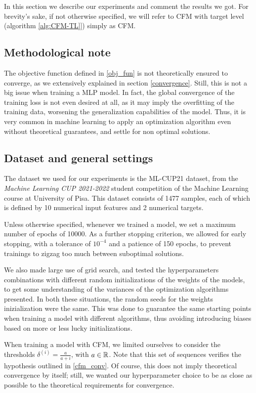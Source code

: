 In this section we describe our experiments and comment the results we got. For brevity's sake, if not otherwise specified, we will refer to CFM with target level (algorithm \ref{alg:CFM-TL}]) simply as CFM. 

\subsection{Methodological note}
The objective function defined in \ref{obj_fun} is not theoretically ensured to converge, as we extensively explained in section \ref{convergence}. Still, this is not a big issue when training a MLP model. In fact, the global convergence of the training loss is not even desired at all, as it may imply the overfitting of the training data, worsening the generalization capabilities of the model. Thus, it is very common in machine learning to apply an optimization algorithm even without theoretical guarantees, and settle for non optimal solutions.

\subsection{Dataset and general settings}
The dataset we used for our experiments is the ML-CUP21 dataset, from the \textit{Machine Learning CUP 2021-2022} student competition of the Machine Learning course at University of Pisa. This dataset consists of 1477 samples, each of which is defined by 10 numerical input features and 2 numerical targets.

Unless otherwise specified, whenever we trained a model, we set a maximum number of epochs of 10000. As a further stopping criterion, we allowed for early stopping, with a tolerance of $10^{-4}$ and a patience of 150 epochs, to prevent trainings to zigzag too much between suboptimal solutions.

We also made large use of grid search, and tested the hyperparameters combinations with different random initializations of the weights of the models, to get some understanding of the variances of the optimization algorithms presented. In both these situations, the random seeds for the weights inizialization were the same. This was done to guarantee the same starting points when training a model with different algorithms, thus avoiding introducing biases based on more or less lucky initializations.

When training a model with CFM, we limited ourselves to consider the thresholds $\delta^{(i)} = \frac{a}{a+i}$, with $a \in \mathbb{R}$.
Note that this set of sequences verifies the hypothesis outlined in \ref{cfm_conv}. Of course, this does not imply theoretical convergence by itself; still, we wanted our hyperparameter choice to be as close as possible to the theoretical requirements for convergence.

